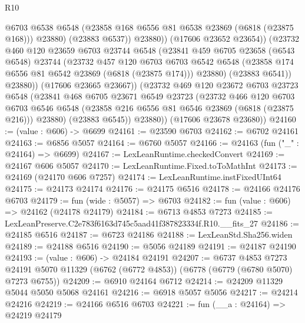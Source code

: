\begin{lexlean}{R10}
\begin{coremodule}
                      @6703
                      @6538
                      @6548
                      (@23858 @168 @6556 @81 @6538 @23869 (@6818 (@23875 @168)))
                      @23880)
                    (@23883 @6537))
                  @23880))
              (@17606 @23652 @23654))
            (@23732
              @460
              @120
              @23659
              @6703
              @23744
              @6548
              (@23841
                @459
                @6705
                @23658
                (@6543 @6548)
                @23744
                (@23732
                  @457
                  @120
                  @6703
                  @6703
                  @6542
                  @6548
                  (@23858 @174 @6556 @81 @6542 @23869 (@6818 (@23875 @174)))
                  @23880)
                (@23883 @6541))
              @23880))
          (@17606 @23665 @23667))
        (@23732
          @469
          @120
          @23672
          @6703
          @23723
          @6548
          (@23841
            @468
            @6705
            @23671
            @6549
            @23723
            (@23732
              @466
              @120
              @6703
              @6703
              @6546
              @6548
              (@23858 @216 @6556 @81 @6546 @23869 (@6818 (@23875 @216)))
              @23880)
            (@23883 @6545))
          @23880))
      (@17606 @23678 @23680))
@24160 := (value : @606) -> @6699
@24161 := @23590 @6703
@24162 := @6702 @24161
@24163 := @6856 @5057
@24164 := @6760 @5057
@24166 := @24163 (fun ("_" : @24164) => @6699)
@24167 := LexLeanRuntime.checkedConvert
@24169 := @24167 @606 @5057
@24170 := LexLeanRuntime.Fixed.toToMathInt
@24173 := @24169 (@24170 @606 @7257)
@24174 := LexLeanRuntime.instFixedUInt64
@24175 := @24173 @24174
@24176 := @24175 @6516
@24178 := @24166 @24176 @6703
@24179 := fun (wide : @5057) => @6703
@24182 := fun (value : @606) => @24162 (@24178 @24179)
@24184 := @6713 @4853 @7273
@24185 := LexLeanPreserve.C2e783f6163d745c5aad41f387823334f.R10.__fits_27
@24186 := @24185 @6516
@24187 := @6723 @24186
@24188 := LexLeanStd.Sha256.widen
@24189 := @24188 @6516
@24190 := @5056 @24189
@24191 := @24187 @24190
@24193 := (value : @606) -> @24184 @24191
@24207 := @6737
    @4853
    @7273
    @24191
    @5070
    @11329
    (@6762 (@6772 @4853))
    (@6778 (@6779 (@6780 @5070) @7273 @6755))
@24209 := @6910 @24164 @6712
@24214 := @24209 @11329 @5044 @5050 @5068 @24161
@24216 := @6918 @5057 @5056
@24217 := @24214 @24216
@24219 := @24166 @6516 @6703
@24221 := fun (__a : @24164) => @24219 @24179

\end{coremodule}
\end{lexlean}
